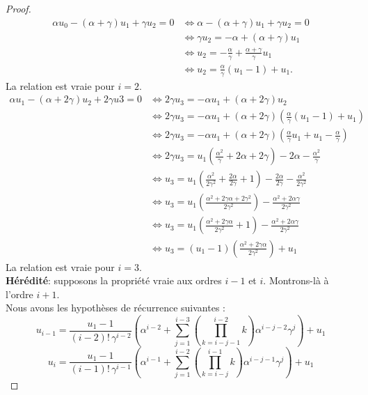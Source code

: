 \documentclass[12pt,a4paper]{report}
\theoremstyle{remark}
\begin{document}
\begin{proof}
\begin{align*}
\alpha u_0 - (\alpha + \gamma) u_1 + \gamma u_2 = 0 &\iff \alpha - (\alpha + \gamma) u_1 + \gamma u_2 = 0 \\
&\iff \gamma u_2 = - \alpha + (\alpha + \gamma)u_1 \\
&\iff u_2 = - \frac{\alpha}{\gamma} + \frac{\alpha + \gamma}{\gamma} u_1 \\
&\iff u_2 = \frac{\alpha}{\gamma}(u_1 - 1) + u_1.
\end{align*}
La relation est vraie pour $i=2$.
\begin{align*}
\alpha u_1 - (\alpha + 2\gamma) u_2+2\gamma u3 = 0 &\iff 2 \gamma u_3 = -\alpha u_1+ (\alpha + 2\gamma) u_2 \\
& \iff 2 \gamma u_3 = -\alpha u_1 + (\alpha + 2\gamma) \left(\frac{\alpha}{\gamma}(u_1 - 1) + u_1 \right)\\
&\iff 2 \gamma u_3 = -\alpha u_1 + (\alpha + 2\gamma) \left(\frac{\alpha}{\gamma}u_1 +u_1 - \frac{\alpha}{\gamma} \right) \\
&\iff 2 \gamma u_3 = u_1\left(\frac{\alpha^2}{\gamma} +2\alpha  +2\gamma\right) - 2\alpha - \frac{\alpha^2}{\gamma} \\
&\iff  u_3 = u_1\left(\frac{\alpha^2}{2\gamma^2} +\frac{2\alpha}{2\gamma}  +1\right) - \frac{2\alpha}{2\gamma} - \frac{\alpha^2}{2\gamma^2}\\
&\iff u_3 = u_1\left(\frac{\alpha^2+2\gamma\alpha + 2\gamma^2}{2\gamma^2}\right)- \frac{\alpha^2+ 2\alpha\gamma}{2\gamma^2} \\
&\iff u_3 = u_1\left(\frac{\alpha^2+2\gamma\alpha}{2\gamma^2} + 1 \right)- \frac{\alpha^2+ 2\alpha\gamma}{2\gamma^2} \\
&\iff u_3 = (u_1 - 1) \left(\frac{\alpha^2+2\gamma\alpha}{2\gamma^2}\right) + u_1
\end{align*}
La relation est vraie pour $i=3$.\\

\textbf{Hérédité}: supposons la propriété vraie aux ordres $i-1$ et $i$. Montrons-là à l'ordre $i+1$.\\

Nous avons les hypothèses de récurrence suivantes :
$$u_{i-1} = \frac{u_1 - 1}{(i-2)! \, \gamma^{i-2}} \left( \alpha^{i-2} + \sum_{j=1}^{i-3}(\prod_{k=i-j-1}^{i-2} k) \alpha^{i-j-2} \gamma^j \right) + u_1 $$
$$u_i = \frac{u_1 - 1}{(i-1)! \, \gamma^{i-1}} \left( \alpha^{i-1} + \sum_{j=1}^{i-2}(\prod_{k=i-j}^{i-1} k) \alpha^{i-j-1} \gamma^j \right) + u_1 $$


\end{proof}
\end{document}
